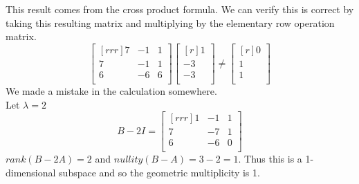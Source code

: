 \documentclass{report}
\begin{document}
This result comes from the cross product formula. We can verify this is correct by taking this resulting matrix and multiplying by the elementary row operation matrix.
\[ \begin{bmatrix}[rrr]7&-1&1\\7&-1&1\\6&-6&6\\\end{bmatrix}\begin{bmatrix}[r]1\\-3\\-3\\\end{bmatrix}\neq \begin{bmatrix}[r]0\\1\\1\\\end{bmatrix} \]
We made a mistake in the calculation somewhere.\\
Let $\lambda=2$
\[ B-2I=\begin{bmatrix}[rrr]1&-1&1\\7&-7&1\\6&-6&0\\\end{bmatrix} \]
$rank(B-2A)=2$ and $nullity(B-A)=3-2=1$. Thus this is a 1-dimensional subspace and so the geometric multiplicity is 1.
\end{document}

